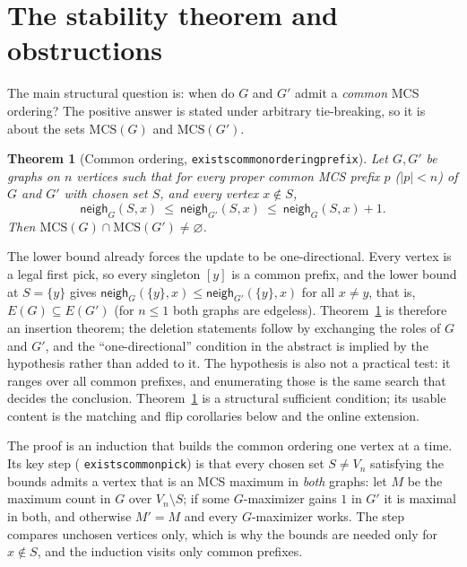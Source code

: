 \documentclass[11pt]{article}
\newtheorem{theorem}{Theorem}
\theoremstyle{definition}
\theoremstyle{remark}
\newcommand{\leanname}[1]{%
  \texttt{\begingroup\def\_{\textunderscore\allowbreak}#1\endgroup}}
\newcommand{\mcso}{\mathrm{MCS}}
\newcommand{\neigh}{\mathsf{neigh}}
\begin{document}
\section{The stability theorem and obstructions}
\label{sec:stab}

The main structural question is: when do $G$ and $G'$ admit a \emph{common} MCS
ordering? The positive answer is stated under arbitrary tie-breaking, so it is
about the sets $\mcso(G)$ and $\mcso(G')$.

\begin{theorem}[Common ordering, \leanname{exists\_common\_ordering\_prefix}]
\label{thm:common}
Let $G,G'$ be graphs on $n$ vertices such that for every proper common MCS
prefix $p$ ($|p|<n$) of $G$ and $G'$ with chosen set $S$, and every vertex
$x\notin S$,
\[
\neigh_G(S,x)\ \le\ \neigh_{G'}(S,x)\ \le\ \neigh_G(S,x)+1.
\]
Then $\mcso(G)\cap\mcso(G')\neq\varnothing$.
\end{theorem}

The lower bound already forces the update to be one-directional. Every vertex is
a legal first pick, so every singleton $[y]$ is a common prefix, and the lower
bound at $S=\{y\}$ gives $\neigh_G(\{y\},x)\le\neigh_{G'}(\{y\},x)$ for all
$x\neq y$, that is, $E(G)\subseteq E(G')$ (for $n\le 1$ both graphs are
edgeless). Theorem~\ref{thm:common} is therefore
an insertion theorem; the deletion statements follow by exchanging the roles of
$G$ and $G'$, and the ``one-directional'' condition in the abstract is implied
by the hypothesis rather than added to it. The hypothesis is also not a
practical test: it ranges over all common prefixes, and enumerating those is the
same search that decides the conclusion. Theorem~\ref{thm:common} is a
structural sufficient condition; its usable content is the matching and flip
corollaries below and the online extension.

The proof is an induction that builds the common ordering one vertex at a time.
Its key step (\leanname{exists\_common\_pick}) is that every chosen set
$S\neq V_n$ satisfying the bounds admits a vertex that is an MCS maximum in
\emph{both} graphs: let $M$ be the maximum count in $G$ over $V_n\setminus S$; if
some $G$-maximizer gains $1$ in $G'$ it is maximal in both, and otherwise $M'=M$
and every $G$-maximizer works. The step compares unchosen vertices only, which
is why the bounds are needed only for $x\notin S$, and the induction visits only
common prefixes.
\end{document}
